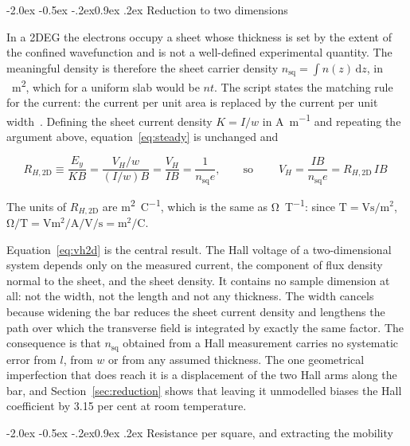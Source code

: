 \documentclass[11pt,a4paper]{article}
\makeatletter
\renewcommand\subsection{\@startsection{subsection}{2}{\z@}%
  {-2.0ex \@plus -0.5ex \@minus -.2ex}{0.9ex \@plus .2ex}%
  {\normalfont\normalsize\bfseries}}
\newcommand{\Rhtwod}{R_{H,\mathrm{2D}}}
\newcommand{\nsq}{n_{\mathrm{sq}}}
\makeatother
\begin{document}
\subsection{Reduction to two dimensions}

In a 2DEG the electrons occupy a sheet whose thickness is set by the extent of the confined
wavefunction and is not a well-defined experimental quantity. The meaningful density is
therefore the sheet carrier density $\nsq = \int n(z)\,\mathrm{d}z$, in
\unit{\per\metre\squared}, which for a uniform slab would be $nt$. The script states the
matching rule for the current: the current per unit area is replaced by the current per unit
width~\cite{script}. Defining the sheet current density $K = I/w$ in
\unit{\ampere\per\metre} and repeating the argument above, equation~\eqref{eq:steady} is
unchanged and

\begin{equation}
\Rhtwod \equiv \frac{E_y}{KB} = \frac{V_H/w}{(I/w)B} = \frac{V_H}{IB} = \frac{1}{\nsq e},
\qquad\text{so}\qquad
\boxed{\;V_H = \frac{IB}{\nsq e} = \Rhtwod\, I B\;}
\label{eq:vh2d}
\end{equation}

The units of $\Rhtwod$ are \unit{\metre\squared\per\coulomb}, which is the same as
\unit{\ohm\per\tesla}: since $\unit{\tesla}=\unit{\volt\second\per\metre\squared}$,
$\unit{\ohm\per\tesla} = \unit{\volt\metre\squared\per\ampere\per\volt\per\second}
= \unit{\metre\squared\per\coulomb}$.

Equation~\eqref{eq:vh2d} is the central result. The Hall voltage of a two-dimensional system
depends only on the measured current, the component of flux density normal to the sheet, and
the sheet density. It contains no sample dimension at all: not the width, not the length and
not any thickness. The width cancels because widening the bar reduces the sheet current
density and lengthens the path over which the transverse field is integrated by exactly the
same factor. The consequence is that $\nsq$ obtained from a Hall measurement carries no
systematic error from $l$, from $w$ or from any assumed thickness. The one geometrical
imperfection that does reach it is a displacement of the two Hall arms along the bar, and
Section~\ref{sec:reduction} shows that leaving it unmodelled biases the Hall coefficient by
\num{3.15} per cent at room temperature.

\subsection{Resistance per square, and extracting the mobility}
\end{document}
